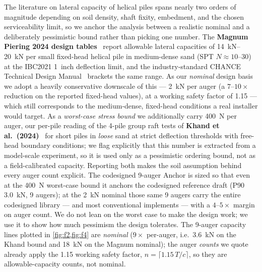 \documentclass[11pt,a4paper]{article}
\begin{document}
The literature on lateral capacity of helical piles spans nearly two orders of magnitude depending on soil density, shaft fixity, embedment, and the chosen serviceability limit, so we anchor the analysis between a realistic nominal and a deliberately pessimistic bound rather than picking one number. The \textbf{Magnum Piering 2024 design tables}~\cite{magnum2024fixed} report allowable lateral capacities of \SIrange{14}{20}{\kilo\newton} per small fixed-head helical pile in medium-dense sand (SPT $N \approx 10$--$30$) at the IBC2021 \SI{1}{inch} deflection limit, and the industry-standard CHANCE Technical Design Manual~\cite{chance2024manual} brackets the same range. As our \emph{nominal} design basis we adopt a heavily conservative downscale of this --- \SI{2}{\kilo\newton} per auger (a $7$--$10\times$ reduction on the reported fixed-head values), at a working safety factor of 1.15 --- which still corresponds to the medium-dense, fixed-head conditions a real installer would target. As a \emph{worst-case stress bound} we additionally carry \SI{400}{\newton} per auger, our per-pile reading of the 4-pile group raft tests of \textbf{Khand et al.\ (2024)}~\cite{khand2024helical} for short piles in \emph{loose} sand at strict deflection thresholds with free-head boundary conditions; we flag explicitly that this number is extracted from a model-scale experiment, so it is used only as a pessimistic ordering bound, not as a field-calibrated capacity. Reporting both makes the soil assumption behind every auger count explicit. The codesigned 9-auger Anchor is sized so that even at the \SI{400}{\newton} worst-case bound it anchors the codesigned reference draft (P90 \SI{3.0}{\kilo\newton}, 9 augers); at the \SI{2}{\kilo\newton} nominal those same 9 augers carry the entire codesigned library --- and most conventional implements --- with a $4$--$5\times$ margin on auger count. We do not lean on the worst case to make the design work; we use it to show how much pessimism the design tolerates. The 9-auger capacity lines plotted in \cref{fig:f2,fig:f4} are \emph{nominal} ($9\times$ per-auger, i.e.\ \SI{3.6}{\kilo\newton} on the Khand bound and \SI{18}{\kilo\newton} on the Magnum nominal); the auger \emph{counts} we quote already apply the 1.15 working safety factor, $n = \lceil 1.15\,T / c \rceil$, so they are allowable-capacity counts, not nominal.
\end{document}
